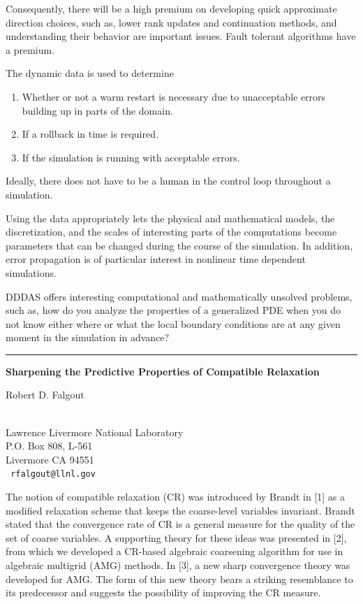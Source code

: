 \documentclass[twosided]{report}
\begin{document}
Consequently, there will be a high premium on developing quick
approximate direction choices, such as, lower rank updates and
continuation methods, and understanding their behavior are
important issues. Fault tolerant algorithms have a premium.

The dynamic data is used to determine
\begin{enumerate}
\item Whether or not a warm restart is necessary due to
unacceptable errors building up in parts of the domain.
\item If a rollback in time is required.
\item If the simulation is running with acceptable errors.
\end{enumerate}

Ideally, there does not have to be a human in the
control loop throughout a simulation.

Using the data appropriately lets the physical and
mathematical models, the discretization, and the
scales of interesting parts of the computations
become parameters that can be changed during the
course of the simulation. In addition, error
propagation is of particular interest in nonlinear
time dependent simulations.

DDDAS offers interesting computational and
mathematically unsolved problems, such as, how do you
analyze the properties of a generalized PDE when you
do not know either where or what the local boundary
conditions are at any given moment in the simulation
in advance?

\begin{center}

\rule{6in}{1pt}
\end{center}

\begin{center}
{\large			\label{falgout}
{\bf
Sharpening the Predictive Properties of Compatible Relaxation
}

Robert D. Falgout} \\
Lawrence Livermore National Laboratory
\\
P.O. Box 808, L-561
\\
Livermore CA 94551
\\ {\tt
rfalgout@llnl.gov
}
\end{center}

The notion of compatible relaxation (CR) was introduced by Brandt in
[1] as a modified relaxation scheme that keeps the coarse-level
variables invariant. Brandt stated that the convergence rate of CR is a
general measure for the quality of the set of coarse variables. A
supporting theory for these ideas was presented in [2], from which we
developed a CR-based algebraic coarsening algorithm for use in
algebraic multigrid (AMG) methods. In [3], a new sharp convergence
theory was developed for AMG. The form of this new theory bears a
striking resemblance to its predecessor and suggests the possibility of
improving the CR measure.
\end{document}
